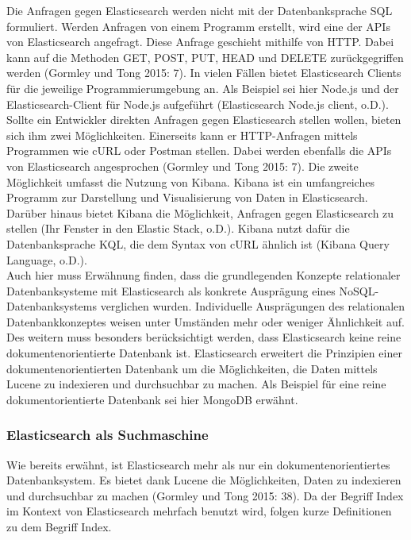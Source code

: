 \documentclass[a4paper]{scrartcl}
\begin{document}
Die Anfragen gegen Elasticsearch werden nicht mit der Datenbanksprache SQL formuliert. Werden Anfragen von einem Programm erstellt, wird eine der APIs von Elasticsearch angefragt. Diese Anfrage geschieht mithilfe von HTTP. Dabei kann auf die Methoden GET, POST, PUT, HEAD und DELETE zurückgegriffen werden (Gormley und Tong 2015: 7). In vielen Fällen bietet Elasticsearch Clients für die jeweilige Programmierumgebung an. Als Beispiel sei hier Node.js und der Elasticsearch-Client für Node.js aufgeführt (Elasticsearch Node.js client, o.D.). \\
Sollte ein Entwickler direkten Anfragen gegen Elasticsearch stellen wollen, bieten sich ihm zwei Möglichkeiten. Einerseits kann er HTTP-Anfragen mittels Programmen wie cURL oder Postman stellen. Dabei werden ebenfalls die APIs von Elasticsearch angesprochen (Gormley und Tong 2015: 7). Die zweite Möglichkeit umfasst die Nutzung von Kibana. Kibana ist ein umfangreiches Programm zur Darstellung und Visualisierung von Daten in Elasticsearch. Darüber hinaus bietet Kibana die Möglichkeit, Anfragen gegen Elasticsearch zu stellen (Ihr Fenster in den Elastic Stack, o.D.). Kibana nutzt dafür die Datenbanksprache KQL, die dem Syntax von cURL ähnlich ist (Kibana Query Language, o.D.). \\

Auch hier muss Erwähnung finden, dass die grundlegenden Konzepte relationaler Datenbanksysteme mit Elasticsearch als konkrete Ausprägung eines NoSQL-Datenbanksystems verglichen wurden. Individuelle Ausprägungen des relationalen Datenbankkonzeptes weisen unter Umständen mehr oder weniger Ähnlichkeit auf. Des weitern muss besonders berücksichtigt werden, dass Elasticsearch keine reine dokumentenorientierte Datenbank ist. Elasticsearch erweitert die Prinzipien einer dokumentenorientierten Datenbank um die Möglichkeiten, die Daten mittels Lucene zu indexieren und durchsuchbar zu machen. Als Beispiel für eine reine dokumentorientierte Datenbank sei hier MongoDB erwähnt.

\subsubsection{Elasticsearch als Suchmaschine}
Wie bereits erwähnt, ist Elasticsearch mehr als nur ein dokumentenorientiertes Datenbanksystem. Es bietet dank Lucene die Möglichkeiten, Daten zu indexieren und durchsuchbar zu machen (Gormley und Tong 2015: 38). Da der Begriff Index im Kontext von Elasticsearch mehrfach benutzt wird, folgen kurze Definitionen zu dem Begriff Index.
\end{document}
